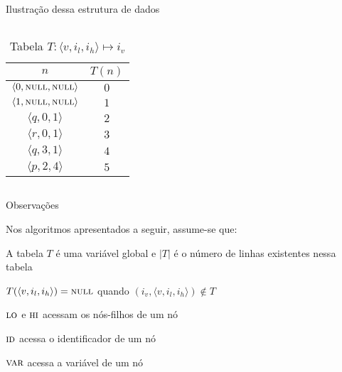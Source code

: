 \expandafter\documentclass\expandafter[table, usenames, svgnames, dvipsnames,14pt, \classopts]{beamer}
\begin{document}
\begin{frame}{Ilustração dessa estrutura de dados}
\begin{columns}[c]
        
            \renewcommand{\arraystretch}{1.5}        
            \begin{table}
                \scriptsize
                \caption{Tabela $T: \langle v,i_l,i_h \rangle \mapsto i_v$}
                \begin{tabular}{c|c}
                    $n$ & $T(n)$\\
                    \hline
                    $\langle 0,\textproc{null},\textproc{null} \rangle$ & $0$\\
                    $\langle 1,\textproc{null},\textproc{null} \rangle$ & $1$\\
                    $\langle q,0,1 \rangle$                             & $2$\\
                    $\langle r,0,1 \rangle$                             & $3$\\
                    $\langle q,3,1 \rangle$                             & $4$\\
                    $\langle p,2,4 \rangle$                             & $5$\\
                \end{tabular}
            \end{table}
            
    \end{columns}
    
\end{frame}

\begin{frame}{Observações}

    Nos algoritmos apresentados a seguir, assume-se que:

    \begin{outline}
        \small
        \1 A tabela $T$ é uma variável global e $|T|$ é o número de linhas existentes nessa tabela

        \1 $T(\langle v,i_l,i_h \rangle) = \textproc{null}$ quando $(i_v, \langle v,i_l,i_h \rangle) \notin T$
        
        \1 $\textproc{lo}$ e $\textproc{hi}$ acessam os nós-filhos de um nó

        \1 $\textproc{id}$ acessa o identificador de um nó
        
        \1 $\textproc{var}$ acessa a variável de um nó
            
    \end{outline}
    
\end{frame}
\end{document}
